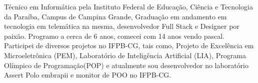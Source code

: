 \begin{cvletter}
  Técnico em Informática pela Instituto Federal de Educação, Ciência e Tecnologia da Paraíba, Campus de Campina Grande, Graduação em andamento em tecnologia em telemática na mesma, desenvolvedor Full Stack e Designer por paixão. Programo a cerca de 6 anos, comecei com 14 anos vendo pascal. Participei de diversos projetos no IFPB-CG, tais como, Projeto de Excelência em Microeletrônica (PEM), Laboratório de Inteligência Artificial (LIA), Programa Olímpico de Programação(POP) e atualmente sou desenvolvedor no laboratório Assert Polo embrapii e monitor de POO no IFPB-CG.
  
\end{cvletter}